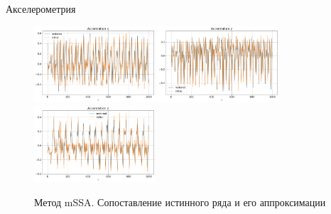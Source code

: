\begin{frame}{Акселерометрия}
{			\begin{figure}
				\includegraphics[width=0.4\textwidth, keepaspectratio]{img/mssa_acceler_compar1.png}
				\includegraphics[width=0.4\textwidth, keepaspectratio]{img/mssa_acceler_compar2.png}
				\includegraphics[width=0.4\textwidth, keepaspectratio]{img/mssa_acceler_compar3.png}
				\caption{Метод mSSA. Сопоставление истинного ряда и его аппроксимации}
			\end{figure}
			
		}
		
	\end{frame}
	
